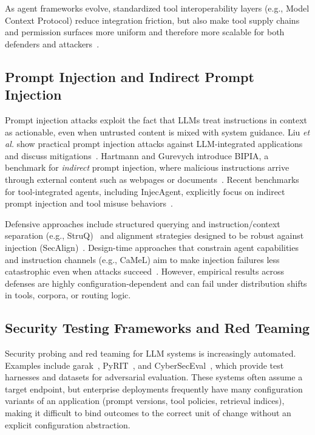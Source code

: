\documentclass[11pt]{article}
\begin{document}
As agent frameworks evolve, standardized tool interoperability layers (e.g., Model Context Protocol) reduce integration friction,
but also make tool supply chains and permission surfaces more uniform and therefore more scalable for both defenders and attackers~\cite{mcp_spec,anthropic_mcp}.

\subsection{Prompt Injection and Indirect Prompt Injection}
Prompt injection attacks exploit the fact that LLMs treat instructions in context as actionable, even when untrusted content is mixed with system guidance.
Liu \emph{et al.} show practical prompt injection attacks against LLM-integrated applications and discuss mitigations~\cite{DBLP:journals/corr/abs-2306-05499}.
Hartmann and Gurevych introduce BIPIA, a benchmark for \emph{indirect} prompt injection, where malicious instructions arrive through external content such as webpages or documents~\cite{DBLP:journals/corr/abs-2312-14197}.
Recent benchmarks for tool-integrated agents, including InjecAgent, explicitly focus on indirect prompt injection and tool misuse behaviors~\cite{injecagent}.

Defensive approaches include structured querying and instruction/context separation (e.g., StruQ)~\cite{struq} and alignment strategies designed to be robust against injection (SecAlign)~\cite{secalign}.
Design-time approaches that constrain agent capabilities and instruction channels (e.g., CaMeL) aim to make injection failures less catastrophic even when attacks succeed~\cite{camel}.
However, empirical results across defenses are highly configuration-dependent and can fail under distribution shifts in tools, corpora, or routing logic.

\subsection{Security Testing Frameworks and Red Teaming}
Security probing and red teaming for LLM systems is increasingly automated.
Examples include garak~\cite{garak}, PyRIT~\cite{pyrit}, and CyberSecEval~\cite{cyberseceval}, which provide test harnesses and datasets for adversarial evaluation.
These systems often assume a target endpoint, but enterprise deployments frequently have many configuration variants of an application (prompt versions, tool policies, retrieval indices),
making it difficult to bind outcomes to the correct unit of change without an explicit configuration abstraction.
\end{document}
